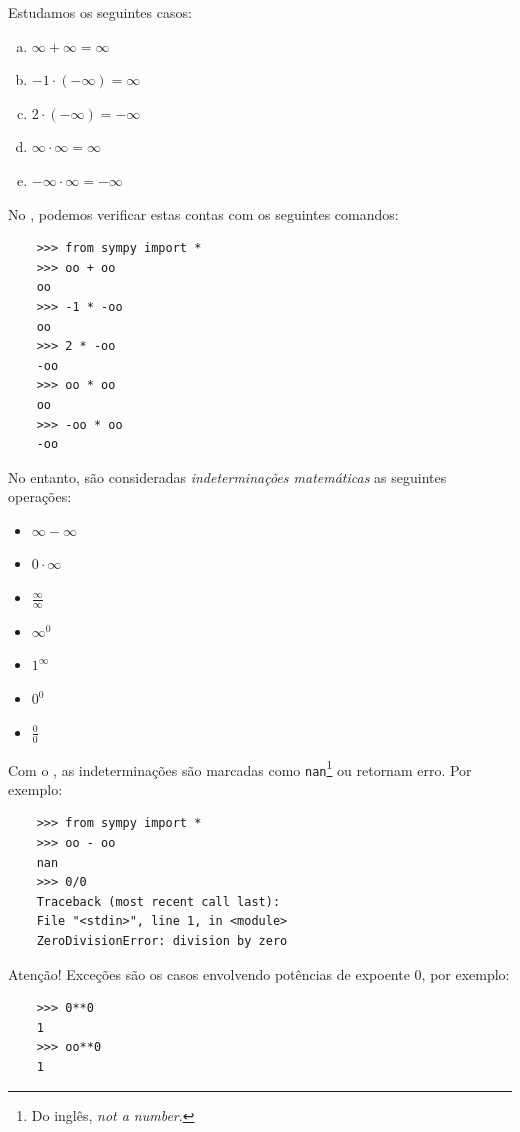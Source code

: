 \begin{ex}
  Estudamos os seguintes casos:
  \begin{enumerate}[a)]
  \item $\infty + \infty = \infty$
  \item $-1\cdot (-\infty) = \infty$
  \item $2\cdot (-\infty) = -\infty$
  \item $\infty\cdot\infty = \infty$
  \item $-\infty\cdot\infty = -\infty$
  \end{enumerate}

  \ifispython
  No \python, podemos verificar estas contas com os seguintes comandos:
  \begin{lstlisting}
    >>> from sympy import *
    >>> oo + oo
    oo
    >>> -1 * -oo
    oo
    >>> 2 * -oo
    -oo
    >>> oo * oo
    oo
    >>> -oo * oo
    -oo
  \end{lstlisting}
  \fi
\end{ex}

No entanto, são consideradas \emph{indeterminações matemáticas} as seguintes operações:
\begin{itemize}
\item $\infty - \infty$
\item $0\cdot\infty$
\item $\displaystyle\frac{\infty}{\infty}$
\item $\infty^0$
\item $1^\infty$
\item $0^0$
\item $\displaystyle\frac{0}{0}$
\end{itemize}

\ifispython
\begin{obs}
  Com o \sympy, as indeterminações são marcadas como \lstinline!nan!\footnote{Do inglês, {\it not a number}.} ou retornam erro. Por exemplo:
  \begin{lstlisting}
    >>> from sympy import *
    >>> oo - oo
    nan
    >>> 0/0
    Traceback (most recent call last):
    File "<stdin>", line 1, in <module>
    ZeroDivisionError: division by zero
  \end{lstlisting}
  Atenção! Exceções são os casos envolvendo potências de expoente $0$, por exemplo:
  \begin{lstlisting}
    >>> 0**0
    1
    >>> oo**0
    1
  \end{lstlisting}
\end{obs}
\fi

